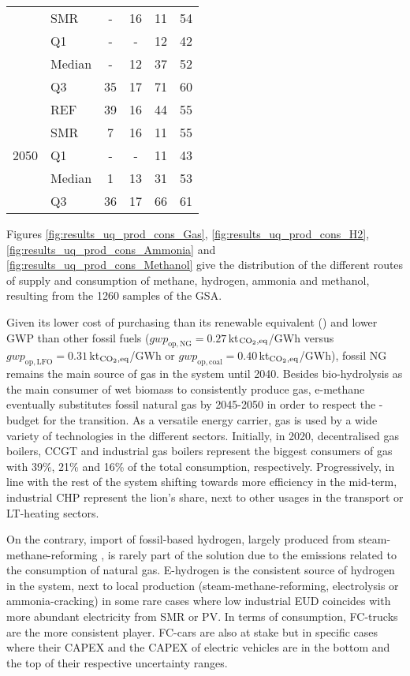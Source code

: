 \begin{table}[htbp!]
\begin{minipage}{\textwidth}
{\begin{tabular}{l l | c c c c}
 & SMR & - & 16 & 11 & 54\\
 \cmidrule{2 - 6}
 & Q1 & - & - & 12 & 42\\
 & Median & - & 12 & 37 & 52\\
 & Q3 & 35 & 17 & 71 & 60\\
\toprule
\multirow{5}{*}{2050}
 & REF & 39 & 16 & 44 & 55\\
 & SMR & 7 & 16 & 11 & 55\\
 \cmidrule{2 - 6}
 & Q1 & - & - & 11 & 43\\
 & Median & 1 & 13 & 31 & 53\\
 & Q3 & 36 & 17 & 66 & 61\\
\bottomrule							
\end{tabular}}
\end{minipage}
\end{table}

Figures \ref{fig:results_uq_prod_cons_Gas}, \ref{fig:results_uq_prod_cons_H2}, \ref{fig:results_uq_prod_cons_Ammonia} and \ref{fig:results_uq_prod_cons_Methanol} give the distribution of the different routes of supply and consumption of methane, hydrogen, ammonia and methanol, resulting from the 1260 samples of the \gls{GSA}.

Given its lower cost of purchasing than its renewable equivalent () and lower \gls{GWP} than other fossil fuels (\ie $\mathit{gwp}_{\mathrm{op,NG}}=0.27$\,kt$_{\ce{CO2},\text{eq}}$/GWh versus $\mathit{gwp}_{\mathrm{op,LFO}}=0.31$\,kt$_{\ce{CO2},\text{eq}}$/GWh or $\mathit{gwp}_{\mathrm{op,coal}}=0.40$\,kt$_{\ce{CO2},\text{eq}}$/GWh), fossil \gls{NG} remains the main source of gas in the system until 2040. Besides bio-hydrolysis as the main consumer of wet biomass to consistently produce gas, e-methane eventually substitutes fossil natural gas by 2045-2050 in order to respect the -budget for the transition. As a versatile energy carrier, gas is used by a wide variety of technologies in the different sectors. Initially, in 2020, decentralised gas boilers, \gls{CCGT} and industrial gas boilers represent the biggest consumers of gas with 39\%, 21\% and 16\% of the total consumption, respectively. Progressively, in line with the rest of the system shifting towards more efficiency in the mid-term, industrial \gls{CHP} represent the lion's share, next to other usages in the transport or \gls{LT}-heating sectors.

On the contrary, import of fossil-based hydrogen, largely produced from steam-methane-reforming \cite{spf_economie_h2}, is rarely part of the solution due to the emissions related to the consumption of natural gas. E-hydrogen is the consistent source of hydrogen in the system, next to local production (\ie steam-methane-reforming, electrolysis or ammonia-cracking) in some rare cases where low industrial \gls{EUD} coincides with more abundant electricity from \gls{SMR} or \gls{PV}. In terms of consumption, \gls{FC}-trucks are the more consistent player. \gls{FC}-cars are also at stake but in specific cases where their CAPEX and the CAPEX of electric vehicles are in the bottom and the top of their respective uncertainty ranges.

